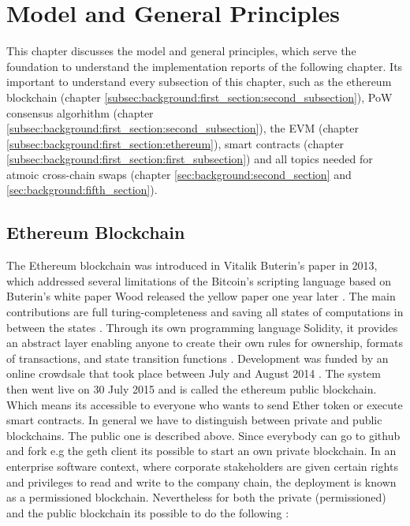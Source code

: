 \chapter{Model and General Principles}
\label{ch:background}

This chapter discusses the model and general principles, which serve the foundation to understand the implementation reports of the following chapter. Its important to understand every subsection of this chapter, such as the ethereum blockchain (chapter \ref{subsec:background:first_section:second_subsection}), \ac{PoW} consensus algorhithm (chapter \ref{subsec:background:first_section:second_subsection}), the \ac{EVM} (chapter \ref{subsec:background:first_section:ethereum}), smart contracts (chapter \ref{subsec:background:first_section:first_subsection}) and all topics needed for atmoic cross-chain swaps (chapter \ref{sec:background:second_section} and \ref{sec:background:fifth_section}). 


%
%
\section{Ethereum Blockchain}
\label{sec:background:first_section}
The Ethereum blockchain was introduced in Vitalik Buterin’s paper in 2013, which addressed several limitations of the Bitcoin’s scripting language \cite{buterin2013ethereum} based on Buterin's white paper Wood released the yellow paper one year later \cite{wood2014ethereum}. The main contributions are full turing-completeness and saving all states of computations in between the states \cite{dannen2017introducing}. Through its own programming language Solidity, it provides an abstract layer enabling anyone to create their own rules for ownership, formats of transactions, and state transition functions \cite{vujivcic2018blockchain}. Development was funded by an online crowdsale that took place between July and August 2014 \cite{tapscott2016blockchain}. The system then went live on 30 July 2015 \cite{ethlaunches} and is called the ethereum public blockchain. Which means its accessible to everyone who wants to send Ether token or execute smart contracts. In general we have to distinguish between private and public blockchains. The public one is described above. Since everybody can go to github and fork e.g the geth client its possible to start an own private blockchain. In an enterprise software context, where corporate stakeholders are given certain rights and privileges to read and write to the company chain, the deployment is known as a permissioned blockchain. Nevertheless for both the private (permissioned) and the public blockchain its possible to do the following \cite{dannen2017introducing}:


